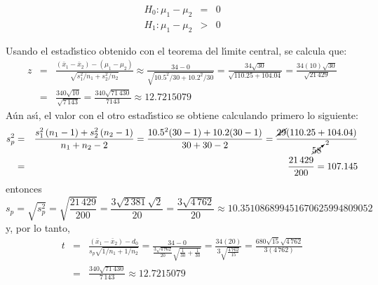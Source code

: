 \begin{solucion}
 \begin{hipotesis}
  \begin{eqnarray*}
   H_0: \mu_1 - \mu_2 & = & 0 \\
   H_1: \mu_1 - \mu_2 & > & 0
  \end{eqnarray*}
 \end{hipotesis}

 \begin{estadistico}
  Usando el estad\'{\i}stico obtenido con el teorema
  del l\'{\i}mite central, se calcula que:
  \begin{eqnarray*}
   z & = & \frac{\left( \bar{x}_1 - \bar{x}_2 \right) - \left( \mu_1 - \mu_2 \right)}{\sqrt{s_1^2/n_1 + s_2^2/n_2}}
   \approx \frac{34-0}{\sqrt{10.5^2/30 + 10.2^2/30}}
   = \frac{34\sqrt{30}}{\sqrt{110.25+104.04}}
   = \frac{34(10)\sqrt{30}}{\sqrt{21\,429}} \\
   & = & \frac{340\sqrt{10}}{\sqrt{7\,143}}
   = \frac{340\sqrt{71\,430}}{7143} \approx 12.7215079
  \end{eqnarray*}
  A\'un as\'{\i}, el valor con el otro estad\'{\i}stico
  se obtiene calculando primero lo siguiente:
  \begin{eqnarray*}
   s_p^2 & = &
   \frac{
   s_1^2 \left( n_1 - 1 \right) + s_2^2\left( n_2 - 1 \right)
   }{
   n_1 + n_2 - 2
   }
   = \frac{10.5^2(30-1) + 10.2(30-1)}{30+30-2}
   = \frac{\cancel{29}(110.25 + 104.04)}{\cancelto{2}{58}} \\
   & = & \frac{21\,429}{200}
   = 107.145
  \end{eqnarray*}
  entonces
  \begin{equation*}
   s_p = \sqrt{s_p^2} = \sqrt{\frac{21\,429}{200}}
   = \frac{3\sqrt{2\,381}\sqrt{2}}{20}
   = \frac{3\sqrt{4\,762}}{20}
   \approx 10.351086899451670625994809052
  \end{equation*}
  y, por lo tanto,
  \begin{eqnarray*}
   t & = & 
   \frac{
   \left( \bar{x}_1 - \bar{x}_2 \right) - d_0
   }{
   s_p\sqrt{1/n_1 + 1/n_2}
   }
   = \frac{34-0}{\frac{3\sqrt{4\,762}}{20}\sqrt{\frac{1}{30}+\frac{1}{30}}}
   = \frac{34(20)}{3\sqrt{\frac{4\,762}{15}}}
   = \frac{680\sqrt{15}\sqrt{4\,762}}{3(4\,762)} \\
   & = & \frac{340\sqrt{71\,430}}{7\,143}
   \approx 12.7215079
  \end{eqnarray*}
 \end{estadistico}


\end{solucion}
